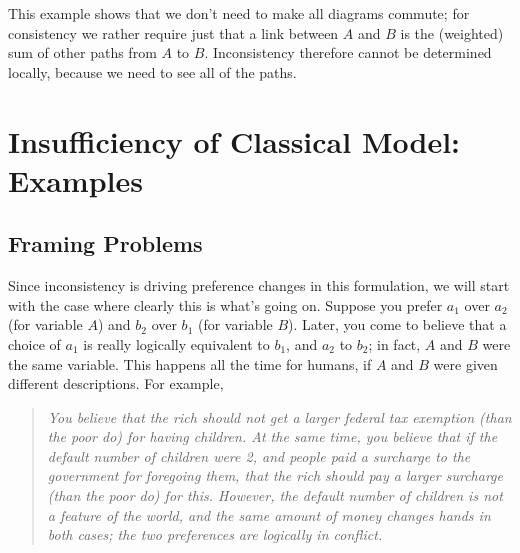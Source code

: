 \documentclass{article}
\begin{document}
	This example shows that we don't need to make all diagrams commute; for consistency we rather require just that a link between $A$ and $B$ is the (weighted) sum of other paths from $A$ to $B$. Inconsistency therefore cannot be determined locally, because we need to see all of the paths.
	

	
	
	
	
	
	
		
	
	
	\section{Insufficiency of Classical Model: Examples}
	
	
	\subsection{Framing Problems}
	Since inconsistency is driving preference changes in this formulation, we will start with the case where clearly this is what's going on. 
	Suppose you prefer $a_1$ over $a_2$ (for variable $A$) and $b_2$ over $b_1$ (for variable $B$). Later, you come to believe that a choice of $a_1$ is really logically equivalent to $b_1$, and $a_2$ to $b_2$; in fact, $A$ and $B$ were the same variable. This happens all the time for humans, if $A$ and $B$ were given different descriptions. For example,
	
	\begin{quotation}
		\it\small
		You believe that the rich should not get a larger federal tax exemption (than the poor do) for having children.
		At the same time, you believe that if the default number of children were 2, and people paid a surcharge to the government for foregoing them, that the rich should pay a larger surcharge (than the poor do) for this. 
		However, the default number of children is not a feature of the world, and the same amount of money changes hands in both cases; the two preferences are logically in conflict.
		
	\end{quotation}
	
\end{document}
